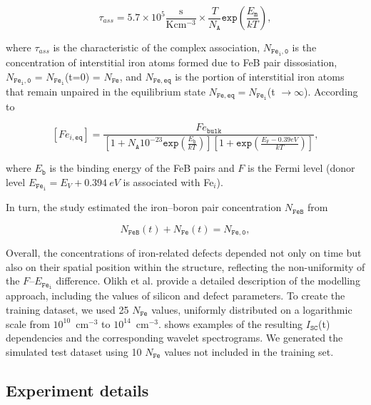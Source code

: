 \documentclass[10pt]{iopart}
\begin{document}
\begin{equation}\label{eqtauass}
  \tau_{ass}=5.7 \times 10^5 \frac{\mathrm{s}}{\mathrm{Kcm^{-3}}} \times \frac{T}{N_\mathtt{A}}\mathtt{exp}(\frac{E_\mathtt{m}}{kT}),
\end{equation}

where $\tau_{ass}$ is the characteristic of the  complex association, $N_\mathtt{Fe_i,0}$ is the concentration of interstitial iron atoms formed due to FeB pair dissosiation, $N_\mathtt{Fe_i,0}$ = $N_\mathtt{Fe_i}$(t=0) = $N_\mathtt{Fe}$, and $N_\mathtt{Fe,eq}$ is the portion of interstitial iron atoms that remain unpaired in the equilibrium state $N_\mathtt{Fe,eq}=N_\mathtt{Fe_i}$(t $\rightarrow \infty$). 
According to \cite{MurphyJAP2011, Wijaranakula}

\begin{equation}\label{eqFeieq}
  [Fe_{i,\mathtt{eq}}]=\frac{Fe_{\mathtt{bulk}}}{[1+N_\mathtt{A}10^{-23}\mathtt{exp}(\frac{E_\mathtt{b}}{kT})][1+\mathtt{exp}(\frac{E_\mathtt{F}-0.39eV}{kT})]},
\end{equation}

where $E_\mathtt{b}$ is the binding energy of the FeB pairs and $F$ is the Fermi level (donor level $E_\mathtt{Fe_i}=E_V+0.394~eV$ is associated with Fe$_i$).


In turn, the study estimated the iron–boron pair concentration $N_\mathtt{FeB}$ from

\begin{equation}\label{eqNFeB}
  N_\mathtt{FeB}(t)+N_\mathtt{Fe}(t)=N_\mathtt{Fe,0},
\end{equation}

Overall, the concentrations of iron-related defects depended not only on time but also on their spatial position within the structure, reflecting the non-uniformity of the $F$–$E_\mathtt{Fe_i}$ difference. 
Olikh et al. \cite{Olikh2025MSEB, Olikh2019SM} provide a detailed description of the modelling approach, including the values of silicon and defect parameters.
To create the training dataset, we used 25 $N_\mathtt{Fe}$ values, uniformly distributed on a logarithmic scale from $10^{10}$~cm$^{-3}$ to $10^{14}$~cm$^{-3}$. 
 shows examples of the resulting $I_\mathtt{SC}$(t) dependencies and the corresponding wavelet spectrograms. 
We generated the simulated test dataset using 10 $N_\mathtt{Fe}$ values not included in the training set.

\subsection{Experiment details}\label{subsec:ExpDet}
\end{document}
